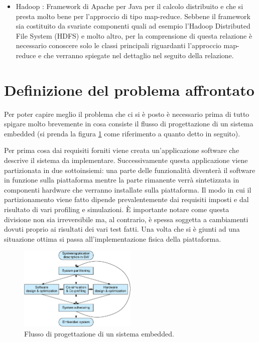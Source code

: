 \documentclass[]{IEEEtran}
\begin{document}
\begin{itemize}
	\item Hadoop \cite{HADOOP}: Framework di Apache per Java per il calcolo distribuito e che si presta molto bene per l'approccio di tipo map-reduce. Sebbene il framework sia costituito da svariate componenti quali ad esempio l'Hadoop Distributed File System (HDFS) e molto altro, per la comprensione di questa relazione è necessario conoscere solo le classi principali riguardanti l'approccio map-reduce e che verranno spiegate nel dettaglio nel seguito della relazione.
\end{itemize}

\section{Definizione del problema affrontato}
Per poter capire meglio il problema che ci si è posto è necessario prima di tutto spigare molto brevemente in cosa consiste il flusso di progettazione di un sistema embedded (si prenda la figura \ref{pse} come riferimento a quanto detto in seguito).

Per prima cosa  dai requisiti forniti viene creata un'applicazione software che descrive il sistema da implementare. Successivamente questa applicazione viene partizionata in due sottoinsiemi: una parte delle funzionalità diventerà il software in funzione sulla piattaforma mentre la parte rimanente verrà sintetizzata in componenti hardware che verranno installate sulla piattaforma. Il modo in cui il partizionamento viene fatto dipende prevalentemente dai requisiti imposti e dal risultato di vari profiling e simulazioni. È importante notare come questa divisione non sia irreversibile ma, al contrario, è spessa soggetta a cambiamenti dovuti proprio ai risultati dei vari test fatti. Una volta che si è giunti ad una situazione ottima si passa all'implementazione fisica della piattaforma.
\begin{figure}[htp]
	\includegraphics[width=0.5\textwidth]{images/embedded_sys_df.png}
	\caption{Flusso di progettazione di un sistema embedded.}
	\label{pse}
\end{figure}
\end{document}
